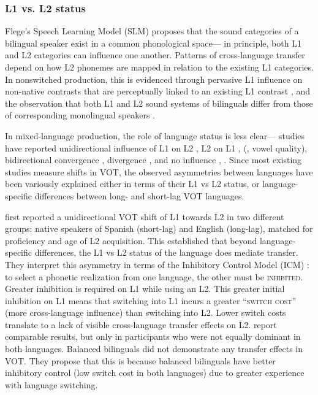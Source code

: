 \documentclass[12 pt]{article}
\begin{document}
\subsubsection*{L1 vs. L2 status} 
Flege's Speech Learning Model (SLM) \citeyearpar[][]{flege1995second,flege2007language} proposes that the sound categories of a bilingual speaker exist in a common phonological space--- in principle, both L1 and L2 categories can influence one another. Patterns of cross-language transfer depend on how L2 phonemes are mapped in relation to the existing L1 categories. In nonswitched production, this is evidenced through pervasive L1 influence on non-native contrasts that are perceptually linked to an existing L1 contrast \citep[see equivalence classification:][]{flege1984limits,flege1987production}, and the observation that both L1 and L2 sound systems of bilinguals differ from those of corresponding monolingual speakers \citep[e.g.][vowel quality]{guion2003vowel}. 

In mixed-language production, the role of language status is less clear--- studies have reported unidirectional influence of L1 on L2 \citep[][VOT]{balukas2015spanish,antoniou2011inter,vsimavckova2015immediate,goldrick2014language}, L2 on L1 \citep[][VOT]{tsui2019impact, olson2013bilingual}, (\cite{elias2017effects}, vowel quality), bidirectional convergence \citep[][VOT]{bullock2009trying, olson2016role}, divergence \citep[][VOT]{bullock2009trying,vsimavckova2018patterns}, and no influence \citep[][vowel quality]{muldner2019phonetics}, \citep[][phonological process]{schwartz2015language}. Since most existing studies measure shifts in VOT, the observed asymmetries between languages have been variously explained either in terms of their L1 vs L2 status, or language-specific differences between long- and short-lag VOT languages. %

\cite{olson2013bilingual} first reported a unidirectional VOT shift of L1 towards L2 in two different groups: native speakers of Spanish (short-lag) and English (long-lag), matched for proficiency and age of L2 acquisition. This established that beyond language-specific differences, the L1 vs L2 status of the language does mediate transfer. They interpret this asymmetry in terms of the Inhibitory Control Model (ICM) \citep{green1998mental}: to select a phonetic realization from one language, the other must be \textsc{inhibited}. Greater inhibition is required on L1 while using an L2. This greater initial inhibition on L1 means that switching into L1 incurs a greater \textsc{``switch cost''} (more cross-language influence) than switching into L2. Lower switch costs translate to a lack of visible cross-language transfer effects on L2. \cite{tsui2019impact} report comparable results, but only in participants who were not equally dominant in both languages. Balanced bilinguals did not demonstrate any transfer effects in VOT. They propose that this is because balanced bilinguals have better inhibitory control (low switch cost in both languages) due to greater experience with language switching.
\end{document}
